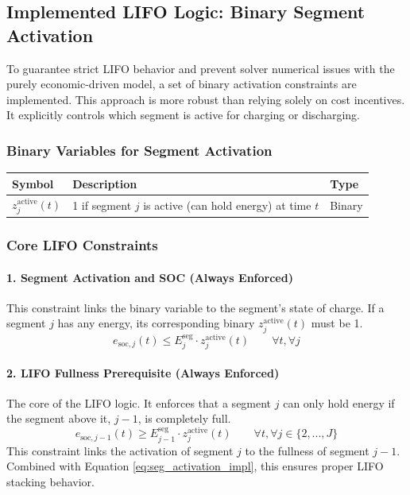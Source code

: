 \documentclass[11pt, a4paper]{article}
\begin{document}
\subsection{Implemented LIFO Logic: Binary Segment Activation}
To guarantee strict LIFO behavior and prevent solver numerical issues with the purely economic-driven model, a set of binary activation constraints are implemented. This approach is more robust than relying solely on cost incentives. It explicitly controls which segment is active for charging or discharging.

\subsubsection{Binary Variables for Segment Activation}
\begin{tabular}{@{}lll}
\toprule
Symbol & Description & Type \\
\midrule
$z^{\text{active}}_{j}(t)$ & 1 if segment $j$ is active (can hold energy) at time $t$ & Binary \\
\bottomrule
\end{tabular}

\subsubsection{Core LIFO Constraints}

\paragraph{1. Segment Activation and SOC (Always Enforced)}
This constraint links the binary variable to the segment's state of charge. If a segment $j$ has any energy, its corresponding binary $z^{\text{active}}_{j}(t)$ must be 1.
\begin{equation}
    e_{\mathrm{soc},j}(t) \le E^{\mathrm{seg}}_{j} \cdot z^{\text{active}}_{j}(t) \qquad \forall t, \forall j \label{eq:seg_activation_impl}
\end{equation}

\paragraph{2. LIFO Fullness Prerequisite (Always Enforced)}
The core of the LIFO logic. It enforces that a segment $j$ can only hold energy if the segment above it, $j-1$, is completely full.
\begin{equation}
    e_{\mathrm{soc},j-1}(t) \ge E^{\mathrm{seg}}_{j-1} \cdot z^{\text{active}}_{j}(t) \qquad \forall t, \forall j \in \{2, ..., J\} \label{eq:lifo_fullness_impl}
\end{equation}
This constraint links the activation of segment $j$ to the fullness of segment $j-1$. Combined with Equation \eqref{eq:seg_activation_impl}, this ensures proper LIFO stacking behavior.
\end{document}
